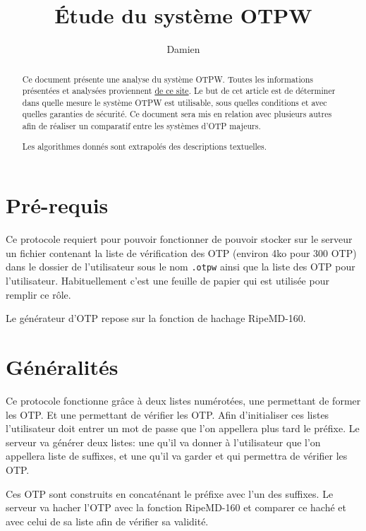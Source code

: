 \documentclass{../res/univ-projet}
\title{\'Etude du syst\`eme OTPW}
\author{Damien \bsc{PICARD}}
\begin{document}
\maketitle

\begin{abstract}
        Ce document présente une analyse du système OTPW. Toutes les
    informations présentées et analysées proviennent 
    \href{http://www.cl.cam.ac.uk/~mgk25/otpw.html}{de ce site}. Le
    but de cet article est de déterminer dans quelle mesure le
    système OTPW est utilisable, sous quelles conditions et avec quelles 
    garanties de sécurité.
    Ce document sera mis en relation avec plusieurs autres afin de réaliser un
    comparatif entre les systèmes d'OTP majeurs.

    Les algorithmes donnés sont extrapolés des descriptions textuelles.
\end{abstract}
\newpage
\tableofcontents
\newpage

\section{Pré-requis}
        Ce protocole requiert pour pouvoir fonctionner de pouvoir stocker
    sur le serveur un fichier contenant la liste de vérification des OTP (environ 
    4ko pour 300 OTP) dans le dossier de l'utilisateur sous le nom \verb?.otpw?
    ainsi que la liste des OTP pour l'utilisateur. Habituellement
    c'est une feuille de papier qui est utilisée pour remplir ce rôle.

        Le générateur d'OTP repose sur la fonction de hachage RipeMD-160.

\section{Généralités}
        Ce protocole fonctionne grâce à deux listes numérotées, une permettant 
    de former les OTP. Et une permettant de vérifier les OTP. Afin d'initialiser
    ces listes l'utilisateur doit entrer un mot de passe que l'on appellera plus
    tard le préfixe. Le serveur va générer deux listes: une qu'il va donner à
    l'utilisateur que l'on appellera liste de suffixes, et une qu'il va garder
    et qui permettra de vérifier les OTP.

        Ces OTP sont construits en concaténant le préfixe avec l'un des suffixes.
    Le serveur va hacher l'OTP avec la fonction
    RipeMD-160 et comparer ce haché et avec celui de sa liste afin de vérifier sa validité.
\end{document}
